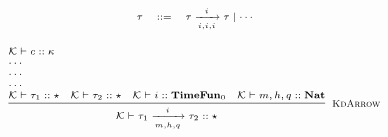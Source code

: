 \documentclass[fleqn]{article}
\begin{document}
\[
\scriptsize
\begin{array}{rcl}
\tau & ::= & \tau \xrightarrow[i,i,i]{i} \tau \mid \cdots
\end{array}
\]

\[
\scriptsize
\begin{array}{l}
\mathcal{K} \vdash c :: \kappa \\
\cdots \\
\cdots \\
\cdots \\
\infer[\textsc{KdArrow}]{\mathcal{K} \vdash \tau_1 \xrightarrow[m,h,q]{i} \tau_2 :: \star}{\mathcal{K} \vdash \tau_1 :: \star & \mathcal{K} \vdash \tau_2 :: \star & \mathcal{K} \vdash i :: \mathbf{TimeFun}_0 & \mathcal{K} \vdash m,h,q :: \mathbf{Nat}}
\end{array}
\]

\newcommand{\jtygc}[7]{#1 \vdash #2 : #3 \triangleright #4 \mid (#5, #6, #7)}
\end{document}
